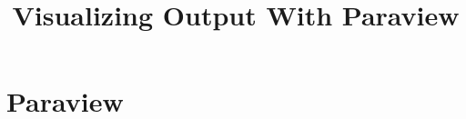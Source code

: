 \documentclass{report}
\begin{document}
\title{Visualizing Output With Paraview}
\maketitle{}

\chapter{Paraview}

\end{document}
